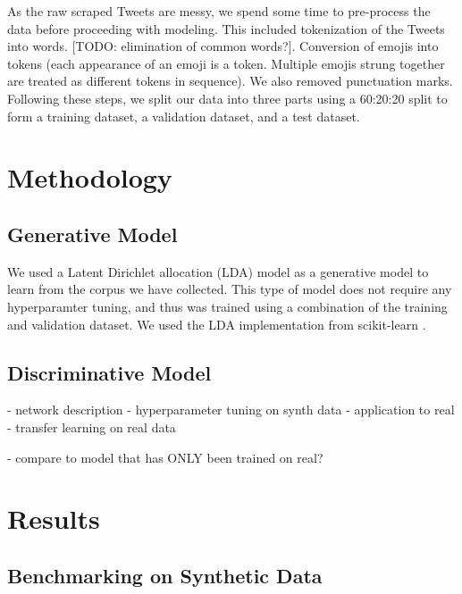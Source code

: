 \documentclass[11pt]{article}
\begin{document}
As the raw scraped Tweets are messy, we spend some time to pre-process the data before proceeding with modeling. This included tokenization of the Tweets into words. [TODO: elimination of common words?]. Conversion of emojis into tokens (each appearance of an emoji is a token. Multiple emojis strung together are treated as different tokens in sequence). We also removed punctuation marks. Following these steps, we split our data into three parts using a 60:20:20 split to form a training dataset, a validation dataset, and a test dataset. 


\noindent 



\section{Methodology}

\subsection{Generative Model}
We used a Latent Dirichlet allocation (LDA) model as a generative model to learn from the corpus we have collected. This type of model does not require any hyperparamter tuning, and thus was trained using a combination of the training and validation dataset. We used the LDA implementation from scikit-learn \cite{sklearn}. 


\subsection{Discriminative Model}
- network description
- hyperparameter tuning on synth data
- application to real
- transfer learning on real data

- compare to model that has ONLY been trained on real?

\section{Results}
\subsection{Benchmarking on Synthetic Data}
\end{document}

